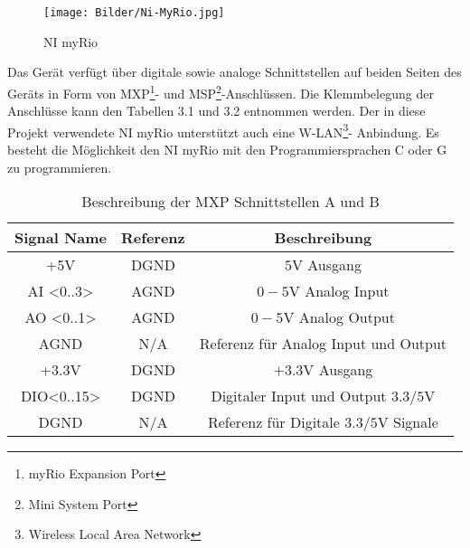 \begin{figure}[H]
	\centering
	\texttt{[image: Bilder/Ni-MyRio.jpg]} %
	\caption{NI myRio \cite{myriobild}}
	\label{fig: NI myRio}
\end{figure}



Das Gerät verfügt über digitale sowie analoge Schnittstellen auf beiden Seiten des Geräts in Form von MXP\footnote{myRio Expansion Port}- und MSP\footnote{Mini System Port}-Anschlüssen. Die Klemmbelegung der Anschlüsse kann den Tabellen 3.1 und 3.2 entnommen werden. Der in diese Projekt verwendete NI myRio unterstützt auch eine W-LAN\footnote{Wireless Local Area Network}- Anbindung. Es besteht die Möglichkeit den NI myRio mit den Programmiersprachen C oder G zu programmieren.

\begin{table}[H]
	\centering
	\begin{tabular}{c|c|c}
		\hline
		Signal Name        &       Referenz        &           Beschreibung      \\ \hline
		+5V   & DGND &        $5\si{\volt}$ Ausgang      \\
		AI <0..3>   &     AGND   &       $0-5\si{ \volt}$ Analog Input      \\
		AO <0..1>   &     AGND   &       $0-5\si{ \volt}$ Analog Output      \\
		AGND   &     N/A   &       Referenz für Analog Input und Output      \\
		+3.3V  &     DGND &        $+3.3\si{\volt}$ Ausgang   \\
		DIO<0..15> &     DGND &        Digitaler Input und Output $3.3/5\si{ \volt}$  \\
		DGND&     N/A &       Referenz für Digitale $3.3/5\si{ \volt}$  Signale  \\
		\hline
	\end{tabular}
	\caption{Beschreibung der MXP Schnittstellen A und B}
	\label{tab:param_voltageDrop}
\end{table}


